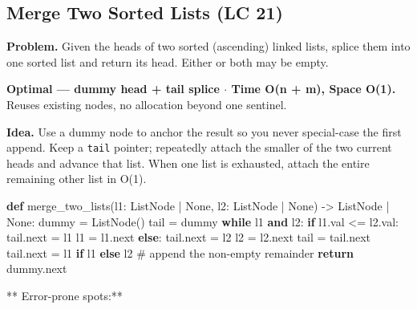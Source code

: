 \documentclass[11pt]{article}
\newenvironment{Shaded}{\begin{snugshade}}{\end{snugshade}}
\newcommand{\BuiltInTok}[1]{\textcolor[rgb]{0.50,0.55,0.55}{#1}}
\newcommand{\CommentTok}[1]{\textcolor[rgb]{0.48,0.49,0.49}{#1}}
\newcommand{\ControlFlowTok}[1]{\textcolor[rgb]{0.99,0.74,0.29}{\textbf{#1}}}
\newcommand{\KeywordTok}[1]{\textcolor[rgb]{0.81,0.81,0.76}{\textbf{#1}}}
\newcommand{\NormalTok}[1]{\textcolor[rgb]{0.81,0.81,0.76}{#1}}
\newcommand{\OperatorTok}[1]{\textcolor[rgb]{0.81,0.81,0.76}{#1}}
\newcommand{\VariableTok}[1]{\textcolor[rgb]{0.15,0.68,0.68}{#1}}
\begin{document}
\subsection{Merge Two Sorted Lists (LC 21)}\label{merge-two-sorted-lists-lc-21}

\textbf{Problem.} Given the heads of two sorted (ascending) linked lists, splice them into one sorted list and return its head. Either or both may be empty.

\textbf{Optimal --- dummy head + tail splice \(\cdot\) Time O(n + m), Space O(1).} Reuses existing nodes, no allocation beyond one sentinel.

\textbf{Idea.} Use a dummy node to anchor the result so you never special-case the first append. Keep a \texttt{tail} pointer; repeatedly attach the smaller of the two current heads and advance that list. When one list is exhausted, attach the entire remaining other list in O(1).


\begin{Shaded}
\begin{Highlighting}[]
\KeywordTok{def}\NormalTok{ merge\_two\_lists(l1: ListNode }\OperatorTok{|} \VariableTok{None}\NormalTok{, l2: ListNode }\OperatorTok{|} \VariableTok{None}\NormalTok{) }\OperatorTok{{-}\textgreater{}}\NormalTok{ ListNode }\OperatorTok{|} \VariableTok{None}\NormalTok{:}
\NormalTok{    dummy }\OperatorTok{=}\NormalTok{ ListNode()}
\NormalTok{    tail }\OperatorTok{=}\NormalTok{ dummy}
    \ControlFlowTok{while}\NormalTok{ l1 }\KeywordTok{and}\NormalTok{ l2:}
        \ControlFlowTok{if}\NormalTok{ l1.val }\OperatorTok{\textless{}=}\NormalTok{ l2.val:}
\NormalTok{            tail.}\BuiltInTok{next} \OperatorTok{=}\NormalTok{ l1}
\NormalTok{            l1 }\OperatorTok{=}\NormalTok{ l1.}\BuiltInTok{next}
        \ControlFlowTok{else}\NormalTok{:}
\NormalTok{            tail.}\BuiltInTok{next} \OperatorTok{=}\NormalTok{ l2}
\NormalTok{            l2 }\OperatorTok{=}\NormalTok{ l2.}\BuiltInTok{next}
\NormalTok{        tail }\OperatorTok{=}\NormalTok{ tail.}\BuiltInTok{next}
\NormalTok{    tail.}\BuiltInTok{next} \OperatorTok{=}\NormalTok{ l1 }\ControlFlowTok{if}\NormalTok{ l1 }\ControlFlowTok{else}\NormalTok{ l2   }\CommentTok{\# append the non{-}empty remainder}
    \ControlFlowTok{return}\NormalTok{ dummy.}\BuiltInTok{next}
\end{Highlighting}
\end{Shaded}

** Error-prone spots:**
\end{document}
